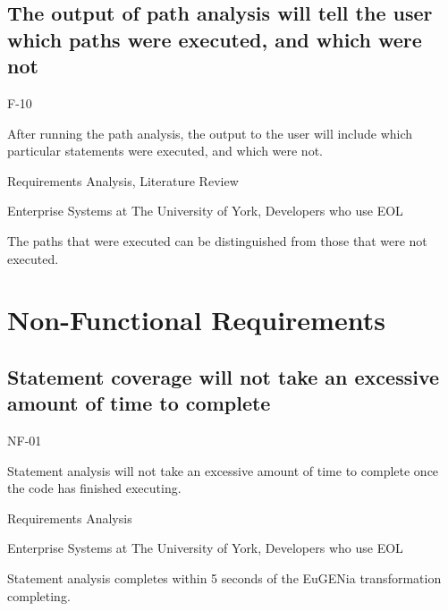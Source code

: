 \subsection{The output of path analysis will tell the user which paths were executed, and which were not}
\begin{description}[style=sameline,leftmargin=4.5cm,nolistsep]
\item[\hspace*{0.3cm}Label] F-10
\item[\hspace*{0.3cm}Description] After running the path analysis, the output to the user will include which particular statements were executed, and which were not.
\item[\hspace*{0.3cm}Source] Requirements Analysis, Literature Review
\item[\hspace*{0.3cm}Stakeholders] Enterprise Systems at The University of York, Developers who use EOL
\item[\hspace*{0.3cm}Satisfiable Conditions] The paths that were executed can be distinguished from those that were not executed.
\end{description}

\section{Non-Functional Requirements}


\subsection{Statement coverage will not take an excessive amount of time to complete}
\begin{description}[style=sameline,leftmargin=4.5cm,nolistsep]
\item[\hspace*{0.3cm}Label] NF-01
\item[\hspace*{0.3cm}Description] Statement analysis will not take an excessive amount of time to complete once the code has finished executing.
\item[\hspace*{0.3cm}Source] Requirements Analysis
\item[\hspace*{0.3cm}Stakeholders] Enterprise Systems at The University of York, Developers who use EOL
\item[\hspace*{0.3cm}Satisfiable Conditions] Statement analysis completes within 5 seconds of the EuGENia transformation completing.
\end{description}

